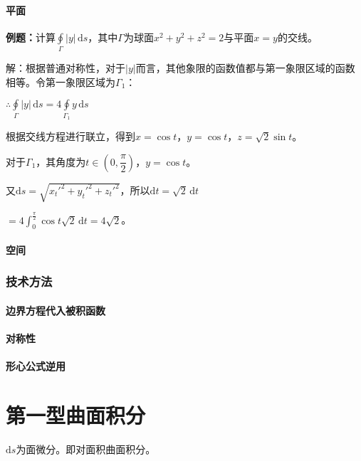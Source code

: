\documentclass[UTF8, 12pt]{ctexart}
\begin{document}
\paragraph{平面} \leavevmode \medskip

\textbf{例题：}计算$\oint\limits_\Gamma\vert y\vert\,\textrm{d}s$，其中$\Gamma$为球面$x^2+y^2+z^2=2$与平面$x=y$的交线。

解：根据普通对称性，对于$\vert y\vert$而言，其他象限的函数值都与第一象限区域的函数相等。令第一象限区域为$\Gamma_1$：

$\therefore\oint\limits_\Gamma\vert y\vert\,\textrm{d}s=4\oint\limits_{\Gamma_1}y\,\textrm{d}s$

根据交线方程进行联立，得到$x=\cos t$，$y=\cos t$，$z=\sqrt{2}\sin t$。

对于$\Gamma_1$，其角度为$t\in\left(0,\dfrac{\pi}{2}\right)$，$y=\cos t$。

又$\textrm{d}s=\sqrt{x_t'^2+y_t'^2+z_t'^2}$，所以$\textrm{d}t=\sqrt{2}\,\textrm{d}t$

$=4\int_0^\frac{\pi}{2}\cos t\sqrt{2}\,\textrm{d}t=4\sqrt{2}$。

\paragraph{空间} \leavevmode \medskip

\subsubsection{技术方法}

\paragraph{边界方程代入被积函数} \leavevmode \medskip

\paragraph{对称性} \leavevmode \medskip

\paragraph{形心公式逆用} \leavevmode \medskip

\section{第一型曲面积分}

$\textrm{d}s$为面微分。即对面积曲面积分。
\end{document}
